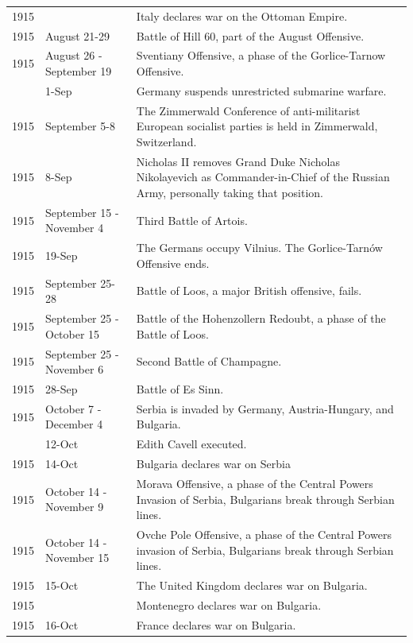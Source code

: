 \documentclass[
  openany]{book}
\begin{document}
\begin{longtable}[t]{rl>{\raggedright\arraybackslash}p{22em}}
\rowcolor{gray!6}  1915 &  & Italy declares war on the Ottoman Empire.\\
1915 & August 21-29 & Battle of Hill 60, part of the August Offensive.\\
\rowcolor{gray!6}  1915 & August 26 - September 19 & Sventiany Offensive, a phase of the Gorlice-Tarnow Offensive.\\
\addlinespace
1915 & 1-Sep & Germany suspends unrestricted submarine warfare.\\
\rowcolor{gray!6}  1915 & September 5-8 & The Zimmerwald Conference of anti-militarist European socialist parties is held in Zimmerwald, Switzerland.\\
1915 & 8-Sep & Nicholas II removes Grand Duke Nicholas Nikolayevich as Commander-in-Chief of the Russian Army, personally taking that position.\\
\rowcolor{gray!6}  1915 & September 15 - November 4 & Third Battle of Artois.\\
1915 & 19-Sep & The Germans occupy Vilnius. The Gorlice-Tarnów Offensive ends.\\
\addlinespace
\rowcolor{gray!6}  1915 & September 25-28 & Battle of Loos, a major British offensive, fails.\\
1915 & September 25 - October 15 & Battle of the Hohenzollern Redoubt, a phase of the Battle of Loos.\\
\rowcolor{gray!6}  1915 & September 25 - November 6 & Second Battle of Champagne.\\
1915 & 28-Sep & Battle of Es Sinn.\\
\rowcolor{gray!6}  1915 & October 7 - December 4 & Serbia is invaded by Germany, Austria-Hungary, and Bulgaria.\\
\addlinespace
1915 & 12-Oct & Edith Cavell executed.\\
\rowcolor{gray!6}  1915 & 14-Oct & Bulgaria declares war on Serbia\\
1915 & October 14 - November 9 & Morava Offensive, a phase of the Central Powers Invasion of Serbia, Bulgarians break through Serbian lines.\\
\rowcolor{gray!6}  1915 & October 14 - November 15 & Ovche Pole Offensive, a phase of the Central Powers invasion of Serbia, Bulgarians break through Serbian lines.\\
1915 & 15-Oct & The United Kingdom declares war on Bulgaria.\\
\addlinespace
\rowcolor{gray!6}  1915 &  & Montenegro declares war on Bulgaria.\\
1915 & 16-Oct & France declares war on Bulgaria.\\

\end{longtable}
\end{document}
